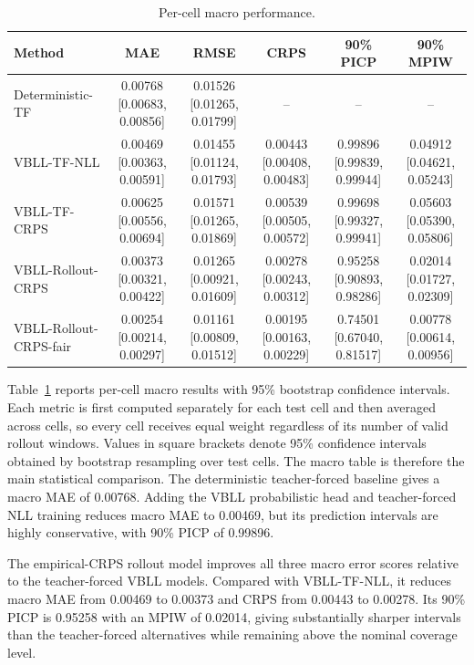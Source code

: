 \documentclass[conference]{IEEEtran}
\begin{document}
\begin{table}[t]
\centering
\scriptsize
\caption{Per-cell macro performance.}
\label{tab:cell-macro}
\setlength{\tabcolsep}{3pt}
\begin{tabular}{@{}lccccc@{}}
\toprule
Method & MAE & RMSE & CRPS & 90\% PICP & 90\% MPIW \\
\midrule
Deterministic-TF
& 0.00768 [0.00683, 0.00856]
& 0.01526 [0.01265, 0.01799]
& -- & -- & -- \\
VBLL-TF-NLL
& 0.00469 [0.00363, 0.00591]
& 0.01455 [0.01124, 0.01793]
& 0.00443 [0.00408, 0.00483]
& 0.99896 [0.99839, 0.99944]
& 0.04912 [0.04621, 0.05243] \\
VBLL-TF-CRPS
& 0.00625 [0.00556, 0.00694]
& 0.01571 [0.01265, 0.01869]
& 0.00539 [0.00505, 0.00572]
& 0.99698 [0.99327, 0.99941]
& 0.05603 [0.05390, 0.05806] \\
VBLL-Rollout-CRPS
& 0.00373 [0.00321, 0.00422]
& 0.01265 [0.00921, 0.01609]
& 0.00278 [0.00243, 0.00312]
& 0.95258 [0.90893, 0.98286]
& 0.02014 [0.01727, 0.02309] \\
VBLL-Rollout-CRPS-fair
& 0.00254 [0.00214, 0.00297]
& 0.01161 [0.00809, 0.01512]
& 0.00195 [0.00163, 0.00229]
& 0.74501 [0.67040, 0.81517]
& 0.00778 [0.00614, 0.00956] \\
\bottomrule
\end{tabular}
\end{table}

Table~\ref{tab:cell-macro} reports per-cell macro results with 95\% bootstrap
confidence intervals. Each metric is first computed separately for each test
cell and then averaged across cells, so every cell receives equal weight
regardless of its number of valid rollout windows. Values in square brackets
denote 95\% confidence intervals obtained by bootstrap resampling over test
cells. The macro table is therefore the main statistical comparison. The
deterministic teacher-forced baseline gives a macro MAE of 0.00768. Adding the
VBLL probabilistic head and teacher-forced NLL training reduces macro MAE to
0.00469, but its prediction intervals are highly conservative, with 90\% PICP
of 0.99896.

The empirical-CRPS rollout model improves all three macro error scores relative
to the teacher-forced VBLL models. Compared with VBLL-TF-NLL, it reduces macro
MAE from 0.00469 to 0.00373 and CRPS from 0.00443 to 0.00278. Its 90\% PICP is
0.95258 with an MPIW of 0.02014, giving substantially sharper intervals than
the teacher-forced alternatives while remaining above the nominal coverage
level.
\end{document}
